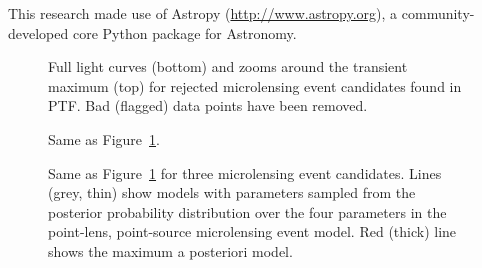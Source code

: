 \documentclass{emulateapj}
\begin{document}
This research made use of Astropy (\url{http://www.astropy.org}), a community-developed core Python package for Astronomy.



\bigskip
\setlength{\baselineskip}{0.6\baselineskip}

\setlength{\baselineskip}{1.667\baselineskip}

\clearpage

\begin{figure}
\centering
{}
\caption{Full light curves (bottom) and zooms around the transient maximum (top) for rejected microlensing event candidates found in PTF. Bad (flagged) data points have been removed.}\label{fig:not_candidates1}
\end{figure}

\begin{figure}
\centering
{}
\caption{Same as Figure~\ref{fig:not_candidates1}. }\label{fig:not_candidates2}
\end{figure}

\begin{figure}
\centering
{}
\caption{Same as Figure~\ref{fig:not_candidates1} for three microlensing event candidates. Lines (grey, thin) show models with parameters sampled from the posterior probability distribution over the four parameters in the point-lens, point-source microlensing event model. Red (thick) line shows the maximum a posteriori model. }\label{fig:candidates}
\end{figure}
\end{document}
